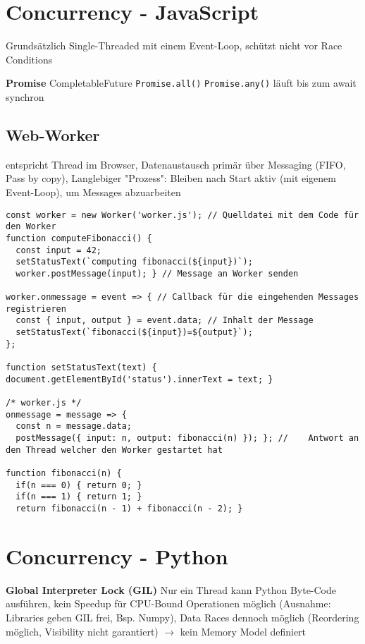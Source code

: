 \section{Concurrency - JavaScript}
Grundsätzlich Single-Threaded mit einem Event-Loop, schützt nicht vor Race Conditions

\textbf{Promise} CompletableFuture \lstinline{Promise.all()} \lstinline{Promise.any()} läuft bis zum await synchron

\subsection{Web-Worker} entspricht Thread im Browser, Datenaustausch primär über Messaging (FIFO, Pass by copy), Langlebiger "Prozess": Bleiben nach Start aktiv (mit eigenem Event-Loop), um Messages abzuarbeiten

\begin{lstlisting}
const worker = new Worker('worker.js'); // Quelldatei mit dem Code für den Worker
function computeFibonacci() {
  const input = 42;
  setStatusText(`computing fibonacci(${input})`);
  worker.postMessage(input); } // Message an Worker senden

worker.onmessage = event => { // Callback für die eingehenden Messages registrieren
  const { input, output } = event.data; // Inhalt der Message
  setStatusText(`fibonacci(${input})=${output}`);
};

function setStatusText(text) { document.getElementById('status').innerText = text; }

/* worker.js */
onmessage = message => {
  const n = message.data;
  postMessage({ input: n, output: fibonacci(n) }); }; //	Antwort an den Thread welcher den Worker gestartet hat

function fibonacci(n) {
  if(n === 0) { return 0; }
  if(n === 1) { return 1; }
  return fibonacci(n - 1) + fibonacci(n - 2); }
\end{lstlisting}

\columnbreak

\section{Concurrency - Python}

\textbf{Global Interpreter Lock (GIL)} Nur ein Thread kann Python Byte-Code ausführen, kein Speedup für CPU-Bound Operationen möglich (Ausnahme: Libraries geben GIL frei, Bsp. Numpy), Data Races dennoch möglich (Reordering möglich, Visibility nicht garantiert) $\rightarrow$ kein Memory Model definiert

